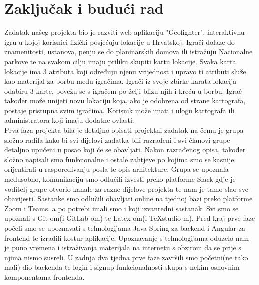\chapter{Zaključak i budući rad}
		
		\textnormal{Zadatak našeg projekta bio je razviti web aplikaciju "Geofighter", interaktivnu igru u kojoj korisnici fizički posjećuju lokacije u Hrvatskoj. Igrači dolaze do znamenitosti, ustanova, penju se do planinarskih domova ili istražuju Nacionalne parkove te na svakom cilju imaju priliku skupiti kartu lokacije. Svaka karta lokacije ima 3 atributa koji određuju njenu vrijednost i upravo ti atributi služe kao materijal za borbu među igračima. Igrači iz svoje zbirke karata lokacija odabiru 3 karte, povežu se s igračem po želji blizu njih i kreću u borbu. Igrač također može unijeti novu lokaciju koja, ako je odobrena od strane kartografa, postaje pristupna svim igračima. Korisnik može imati i ulogu kartografa ili administratora koji imaju dodatne ovlasti.}\\
		 
		 \textnormal{Prva faza projekta bila je detaljno opisati projektni zadatak na čemu je grupa složno radila kako bi svi dijelovi zadatka bili razrađeni i svi članovi grupe detaljno upućeni u posao koji će se obavljati. Nakon razrađenog opisa, također složno napisali smo funkcionalne i ostale zahtjeve po kojima smo se kasnije orijentirali u raspoređivanju posla te opis arhitekture. Grupa se upoznala međusobno, komunikaciju smo odlučili izvesti preko platforme Slack gdje je voditelj grupe otvorio kanale za razne dijelove projekta te nam je tamo slao sve obavijesti. Sastanke smo odlučili obavljati online na tjednoj bazi preko platforme Zoom i Teams, a po potrebi imali smo i koji izvanredni sastanak. Svi smo se upoznali s Git-om(i GitLab-om) te Latex-om(i TeXstudio-m). Pred kraj prve faze počeli smo se upoznavati s tehnologijama Java Spring za backend i Angular za frontend te izradili kostur aplikacije. Upoznavanje s tehnologijama oduzelo nam je puno vremena i istraživanja materijala na internetu s obzirom da se prije s njima nismo susreli. U zadnja dva tjedna prve faze završili smo početni(ne tako mali) dio backenda te login i signup funkcionalnosti skupa s nekim osnovnim komponentama frontenda.}\\
		 
